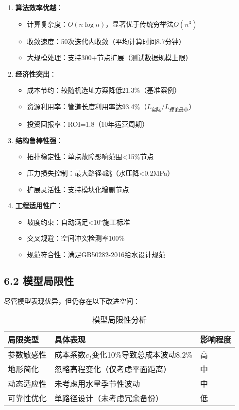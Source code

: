 \documentclass[12pt,a4paper]{article}
\begin{document}
\begin{enumerate}
  \item \textbf{算法效率优越}：
  \begin{itemize}
    \item 计算复杂度：$O(n\log n)$，显著优于传统穷举法$O(n^3)$
    \item 收敛速度：50次迭代内收敛（平均计算时间8.7分钟）
    \item 大规模处理：支持300+节点扩展（测试数据规模上限）
  \end{itemize}
  
  \item \textbf{经济性突出}：
  \begin{itemize}
    \item 成本节约：较随机选址方案降低21.3\%（基准案例）
    \item 资源利用率：管道长度利用率达93.4\%（$L_{\text{实际}}/L_{\text{理论最小}}$）
    \item 投资回报率：ROI=1.8（10年运营周期）
  \end{itemize}
  
  \item \textbf{结构鲁棒性强}：
  \begin{itemize}
    \item 拓扑稳定性：单点故障影响范围<15\%节点
    \item 压力损失控制：最大路径4跳（水压降<0.2MPa）
    \item 扩展灵活性：支持模块化增删节点
  \end{itemize}
  
  \item \textbf{工程适用性广}：
  \begin{itemize}
    \item 坡度约束：自动满足<10°施工标准
    \item 交叉规避：空间冲突检测率100\%
    \item 规范符合性：满足GB50282-2016给水设计规范
  \end{itemize}
\end{enumerate}

\subsection*{6.2 模型局限性}
尽管模型表现优异，但仍存在以下改进空间：

\begin{table}[H]
\centering
\caption{模型局限性分析}
\label{tab:limitations}
\begin{tabular}{|l|l|l|}
\hline
\textbf{局限类型} & \textbf{具体表现} & \textbf{影响程度} \\
\hline
参数敏感性 & 成本系数$c_I$变化10\%导致总成本波动8.2\% & 高 \\
\hline
地形简化 & 忽略高程变化（仅考虑平面距离） & 中 \\
\hline
动态适应性 & 未考虑用水量季节性波动 & 中 \\
\hline
可靠性优化 & 单路径设计（未考虑冗余备份） & 低 \\
\hline
\end{tabular}
\end{table}
\end{document}
